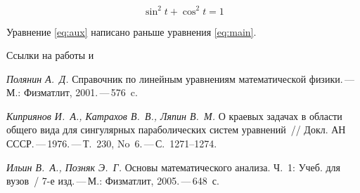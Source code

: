 \begin{equation}
	\label{eq:main}
	\sin^2 t + \cos^2 t = 1
\end{equation}


Уравнение \eqref{eq:aux} написано раньше уравнения \eqref{eq:main}.

Ссылки на работы \cite{Polyanin2001,Kipryanov1976} и \cite{Ilin2005}

\begin{thebibliography}{99}
    \textsl{Полянин А.~Д.}
	Справочник по линейным уравнениям математической фи\-зи\-ки.\,---\,М.: Физматлит, 2001.\,---\,576~c.

    \textsl{Киприянов И.~А., Катрахов В.~В., Ляпин В.~М.}
    О краевых задачах в области общего вида для сингулярных
    параболических систем уравнений~/\!/ Докл. АН СССР.\,---\,1976.\,---\,Т.~230, No~6.\,---\,С.~1271--1274.

    \textsl{Ильин В.~А., Позняк Э.~Г.}
    Основы математического анализа.  Ч.~1: Учеб. для вузов~/ 7-е изд.\,---\,М.:
    Физматлит, 2005.\,---\,648~с.

\end{thebibliography}




